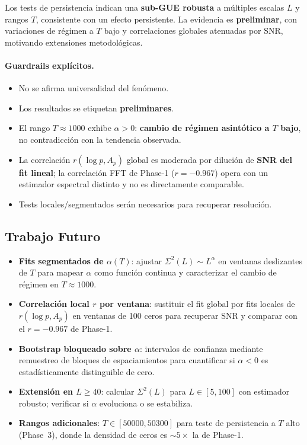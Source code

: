 \documentclass[12pt, a4paper]{article}
\begin{document}
Los tests de persistencia indican una \textbf{sub-GUE robusta} a múltiples
escalas $L$ y rangos $T$, consistente con un efecto persistente.
La evidencia es \textbf{preliminar}, con variaciones de régimen a $T$
bajo y correlaciones globales atenuadas por SNR,
motivando extensiones metodológicas.

\paragraph{Guardrails explícitos.}
\begin{itemize}
  \item No se afirma universalidad del fenómeno.
  \item Los resultados se etiquetan \textbf{preliminares}.
  \item El rango $T\approx 1000$ exhibe $\alpha > 0$: \textbf{cambio de régimen
        asintótico a $T$ bajo}, no contradicción con la tendencia observada.
  \item La correlación $r(\log p, A_p)$ global es moderada por dilución de
        \textbf{SNR del fit lineal}; la correlación FFT de Phase-1 ($r=-0.967$)
        opera con un estimador espectral distinto y no es directamente comparable.
  \item Tests locales/segmentados serán necesarios para recuperar resolución.
\end{itemize}

\subsection{Trabajo Futuro}

\begin{itemize}
  \item \textbf{Fits segmentados de $\alpha(T)$}: ajustar $\Sigma^2(L)\sim L^\alpha$
        en ventanas deslizantes de $T$ para mapear $\alpha$ como función continua
        y caracterizar el cambio de régimen en $T\approx 1000$.
  \item \textbf{Correlación local $r$ por ventana}: sustituir el fit global
        por fits locales de $r(\log p, A_p)$ en ventanas de 100 ceros para
        recuperar SNR y comparar con el $r=-0.967$ de Phase-1.
  \item \textbf{Bootstrap bloqueado sobre $\alpha$}: intervalos de confianza
        mediante remuestreo de bloques de espaciamientos para cuantificar
        si $\alpha < 0$ es estadísticamente distinguible de cero.
  \item \textbf{Extensión en $L\geq 40$}: calcular $\Sigma^2(L)$ para
        $L\in[5,100]$ con estimador robusto; verificar si $\alpha$
        evoluciona o se estabiliza.
  \item \textbf{Rangos adicionales}: $T\in[50000,50300]$ para teste de
        persistencia a $T$ alto (Phase~3), donde la densidad de ceros es
        $\sim 5\times$ la de Phase-1.
\end{itemize}
\end{document}
